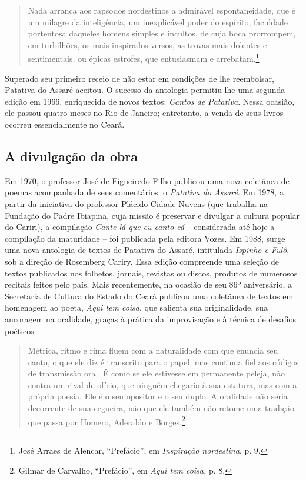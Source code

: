 \begin{quote}
Nada arranca aos rapsodos nordestinos a admirável
espontaneidade, que é um milagre da inteligência, um inexplicável poder do
espírito, faculdade portentosa daqueles homens simples e incultos, de cuja boca
prorrompem, em turbilhões, os mais inspirados versos, as trovas mais dolentes e
sentimentais, ou épicas estrofes, que entusiasmam e arrebatam.\footnote{ José
Arraes de Alencar, “Prefácio”, em \textit{Inspiração nordestina}, p. 9.}
\end{quote}

\noindent Superado seu primeiro receio de não estar em condições de lhe reembolsar, Patativa
do Assaré aceitou. O sucesso da antologia permitiu-lhe uma segunda edição em
1966, enriquecida de novos textos: \textit{Cantos de Patativa}. Nessa ocasião, ele passou
quatro meses no Rio de Janeiro; entretanto, a venda de seus livros ocorreu
essencialmente no Ceará.

\subsection{A divulgação da obra}

Em 1970, o professor José de Figueiredo Filho publicou uma nova coletânea de
poemas acompanhada de seus comentários: o \textit{Patativa do Assaré}. Em 1978, a partir
da iniciativa do professor Plácido Cidade Nuvens (que trabalha na Fundação do
Padre Ibiapina, cuja missão é preservar e divulgar a cultura popular do Cariri),
a compilação \textit{Cante lá que eu canto cá} -- considerada até hoje a compilação da
maturidade -- foi publicada pela editora Vozes. Em 1988, surge uma nova
antologia de textos de Patativa do Assaré, intitulada \textit{Ispinho e Fulô}, sob a
direção de Rosemberg Cariry. Essa edição compreende uma seleção de textos
publicados nos folhetos, jornais, revistas ou discos, produtos de numerosos
recitais feitos pelo país. Mais recentemente, na ocasião de seu 86º aniversário,
a Secretaria de Cultura do Estado do Ceará publicou uma coletânea de textos em
homenagem ao poeta, \textit{Aqui tem coisa}, que salienta sua originalidade, sua
ancoragem na oralidade, graças à prática da improvisação e à técnica de desafios
poéticos:

\begin{quote}
Métrica, ritmo e rima fluem com a naturalidade com que enuncia seu
canto, o que ele diz é transcrito para o papel, mas continua fiel aos códigos de
transmissão oral. É como se ele estivesse em permanente peleja, não contra um
rival de ofício, que ninguém chegaria à sua estatura, mas com a própria poesia.
Ele é o seu opositor e o seu duplo. A oralidade não seria decorrente de sua
cegueira, não que ele também não retome uma tradição que passa por Homero,
Aderaldo e Borges.\footnote{ Gilmar de Carvalho, “Prefácio”, em \textit{Aqui tem
coisa,} p. 8.}
\end{quote}

